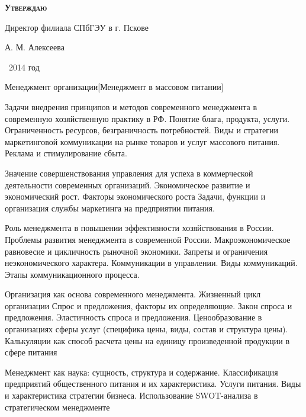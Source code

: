 \documentclass[
	11pt,
	a4paper,
	]
	{article}
\begin{document}
\newlength{\pblength}\settowidth{\pblength}{Директор филиала СПбГЭУ в г. Пскове}

\hfill\parbox{\pblength}{
	\textbf{\textsc{Утверждаю}}\medskip

	Директор филиала СПбГЭУ в г. Пскове\medskip

	\makebox[3cm]{\hrulefill} А. М. Алексеева\medskip

	\makebox[1.5cm]{<<\hrulefill>>} \makebox[3cm]{\hrulefill}\ 2014 год
}


 {Менеджмент организации}[Менеджмент в массовом питании]

	

\noindent{} 
	{
		Задачи внедрения принципов и методов современного менеджмента в современную хозяйственную практику в РФ.
	}{
		Понятие блага, продукта, услуги. Ограниченность ресурсов, безграничность потребностей.
	}{
		Виды и стратегии маркетинговой коммуникации на рынке товаров и услуг массового питания. Реклама и стимулирование сбыта.
	}

\bigskip

\noindent{} 
	{
		Значение совершенствования управления для успеха в коммерческой деятельности современных организаций.
	}{
		Экономическое развитие и экономический рост. Факторы экономического роста
	}{
		Задачи, функции и организация службы маркетинга на предприятии питания.
	}

\bigskip

\noindent{} 
	{
		Роль менеджмента в повышении эффективности хозяйствования в России. Проблемы развития менеджмента в современной России.
	}{
		Макроэкономическое равновесие и цикличность рыночной экономики. Запреты и ограничения неэкономического характера.
	}{
		Коммуникации в управлении. Виды коммуникаций. Этапы коммуникационного процесса.
	}

\bigskip

\noindent{} 
	{
		Организация как основа современного менеджмента. Жизненный цикл организации
	}{
		Спрос и предложения, факторы их определяющие. Закон спроса и предложения. Эластичность спроса и предложения.
	}{
		Ценообразование в организациях сферы услуг (специфика цены, виды, состав и структура цены). Калькуляции как способ расчета цены на единицу произведенной продукции в сфере питания
	}

\bigskip

\noindent{} 
	{
		Менеджмент как наука: сущность, структура и содержание.
	}{
		Классификация предприятий общественного питания и их характеристика. Услуги питания.
	}{
		Виды и характеристика стратегии бизнеса. Использование SWOT-анализа в стратегическом менеджменте
	}
\end{document}

